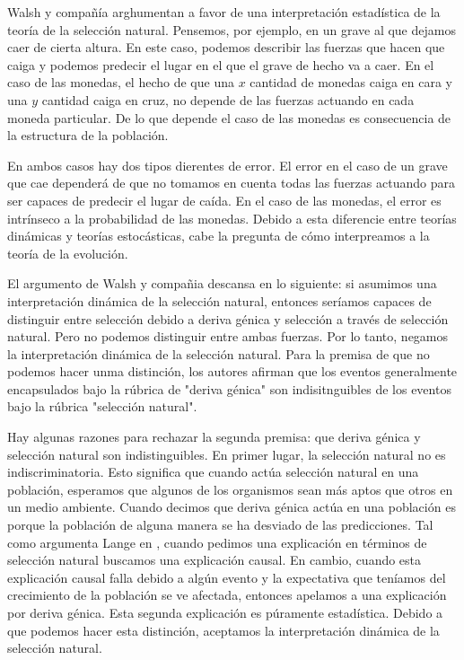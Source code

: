 Walsh y compañía arghumentan a favor de una interpretación estadística de la teoría de la selección natural. Pensemos, por ejemplo, en un grave al que dejamos caer de cierta altura. En este caso, podemos describir las fuerzas que hacen que caiga y podemos predecir el lugar en el que el grave de hecho va a caer. En el caso de las monedas, el hecho de que una $x$ cantidad de monedas caiga en cara y una $y$ cantidad caiga en cruz, no depende de las fuerzas actuando en cada moneda particular. De lo que depende el caso de las monedas es consecuencia de la estructura de la población.

En ambos casos hay dos tipos dierentes de error. El error en el caso de un grave que cae dependerá de que no tomamos en cuenta todas las fuerzas actuando para ser capaces de predecir el lugar de caída. En el caso de las monedas, el error es intrínseco a la probabilidad de las monedas. Debido a esta diferencie entre teorías dinámicas y teorías estocásticas, cabe la pregunta de cómo interpreamos a la teoría de la evolución.

El argumento de Walsh y compañia descansa en lo siguiente: si asumimos una interpretación dinámica de la selección natural, entonces seríamos capaces de distinguir entre selección debido a deriva génica y selección a través de selección natural. Pero no podemos distinguir entre ambas fuerzas. Por lo tanto, negamos la interpretación dinámica de la selección natural. Para la premisa de que no podemos hacer unma distinción, los autores afirman que los eventos generalmente encapsulados bajo la rúbrica de "deriva génica" son indisitnguibles de los eventos bajo la rúbrica "selección natural".

Hay algunas razones para rechazar la segunda premisa: que deriva génica y selección natural son indistinguibles. En primer lugar, la selección natural no es indiscriminatoria. Esto significa que cuando actúa selección natural en una población, esperamos que algunos de los organismos sean más aptos que otros en un medio ambiente. Cuando decimos que deriva génica actúa en una población es porque la población de alguna manera se ha desviado de las predicciones. Tal como argumenta Lange en \citeyear{Lange2013}, cuando pedimos una explicación en términos de selección natural buscamos una explicación causal. En cambio, cuando esta explicación causal falla debido a algún evento y la expectativa que teníamos del crecimiento de la población se ve afectada, entonces apelamos a una explicación por deriva génica. Esta segunda explicación es púramente estadística. Debido a que podemos hacer esta distinción, aceptamos la interpretación dinámica de la selección natural.

